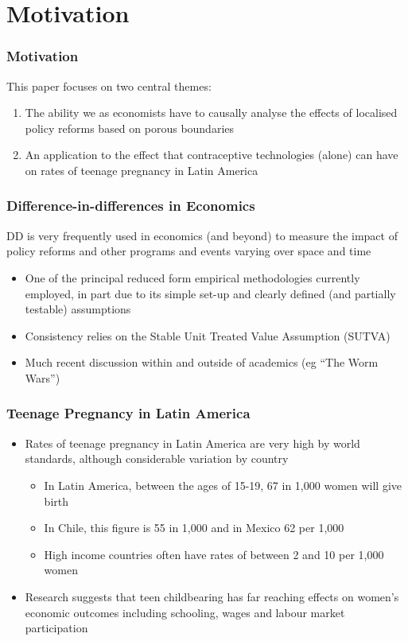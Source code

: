 \documentclass[10pt,letterpaper,subeqn]{beamer}
\begin{document}
\section{Motivation}
\begin{frame}[label=motivation]
  \frametitle{Motivation}
This paper focuses on two central themes:
\vspace{7mm}
\begin{enumerate}
\item The ability we as economists have to causally analyse the effects of 
localised policy reforms based on porous boundaries \\
\vspace{3mm}
\item An application to the effect that contraceptive technologies (alone) can
have on rates of teenage pregnancy in Latin America
\end{enumerate}
\end{frame}

\begin{frame}[label=DDM]
  \frametitle{Difference-in-differences in Economics}
DD is very frequently used in economics (and beyond) 
to measure the impact of policy reforms and other programs and events varying over 
space and time
\vspace{5mm}
\begin{itemize}
 \item One of the principal reduced form empirical methodologies currently 
employed, in part due to its simple set-up and clearly defined (and partially 
testable) assumptions
 \item Consistency relies on the Stable Unit Treated Value Assumption (SUTVA)
 \item Much recent discussion within and outside of academics (eg ``The Worm Wars'')
\end{itemize}
\end{frame}

\begin{frame}[label=teenPreg]
  \frametitle{Teenage Pregnancy in Latin America}
\vspace{4mm}
\begin{itemize}
\item Rates of teenage pregnancy in Latin America are very high by world standards, 
although considerable variation by country
\begin{itemize}
\item In Latin America, between the ages of 15-19, 67 in 1,000 women will give birth
\item In Chile, this figure is 55 in 1,000 and in Mexico 62 per 1,000
\item High income countries often have rates of between 2 and 10 per 1,000 women
\end{itemize}
\item Research suggests that teen childbearing has far reaching effects on women's
economic outcomes including schooling, wages and labour market participation
\end{itemize}
\end{frame}
\end{document}
